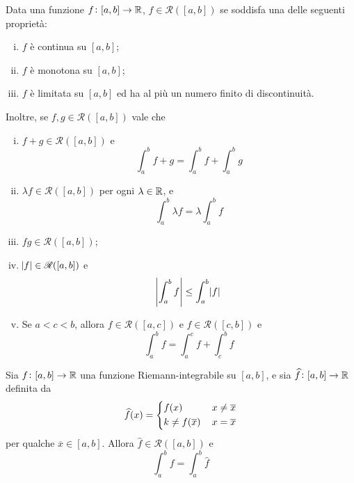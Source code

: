 \begin{corollary}
    \label{cor:8.1}
    Data una funzione $f\colon[a,b]\to \amsbb{R}$, $f\in\mathscr{R}([a,b])$ se soddisfa una delle seguenti proprietà:
    \begin{enumerate}[(i)]
        \item $f$ è continua su $[a,b]$;
        \item $f$ è monotona su $[a,b]$;
        \item $f$ è limitata su $[a,b]$ ed ha al più un numero finito di discontinuità.
    \end{enumerate}
    Inoltre, se $f,g\in\mathscr{R}([a,b])$ vale che
    \begin{enumerate}[(i)]
        \item $f+g\in\mathscr{R}([a,b])$ e 
        \[
        \int_a^b f+g = \int_a^b f + \int_a^b g
        \]
        \item $\lambda f\in\mathscr{R}([a,b])$ per ogni $\lambda\in\amsbb{R}$, e
        \[
        \int_a^b \lambda f = \lambda \int_a^b f
        \]
        \item $fg\in\mathscr{R}([a,b])$;
        \item $\abs{f}\in\mathscr{R}([a,b])$ e
        \[
        \abs{\int_a^b f} \le \int_a^b \abs{f}
        \]
        \item Se $a<c<b$, allora $f\in\mathscr{R}([a,c])$ e $f\in\mathscr{R}([c,b])$ e
        \[
        \int_a^b f = \int_a^c f + \int_c^b f
        \]
    \end{enumerate}
\end{corollary}
\begin{corollary}
    \label{cor:8.2}
    Sia $f\colon [a,b]\to \amsbb{R}$ una funzione Riemann-integrabile su $[a,b]$, e sia $\widehat{f}\colon[a,b]\to \amsbb{R}$ definita da
    \[
    \widehat{f}(x) = \begin{dcases}
        f(x)\, & x\ne \overline{x}\\
        k\ne f(\overline{x})\, & x=\overline{x}
    \end{dcases}
    \]
    per qualche $\overline{x}\in[a,b]$. Allora $\widehat{f}\in \mathscr{R}([a,b])$ e 
    \[
    \int_a^b f = \int_a^b \widehat{f}
    \]
\end{corollary}
